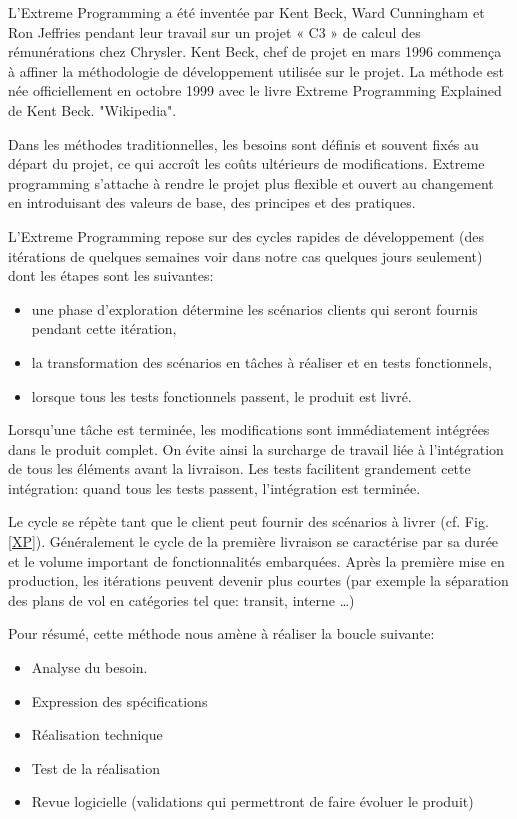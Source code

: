 L'Extreme Programming a été inventée par Kent Beck, Ward Cunningham et Ron Jeffries pendant leur travail sur un projet « C3 » de calcul des rémunérations chez Chrysler. Kent Beck, chef de projet en mars 1996 commença à affiner la méthodologie de développement utilisée sur le projet. La méthode est née officiellement en octobre 1999 avec le livre Extreme Programming Explained de Kent Beck. "Wikipedia".

Dans les méthodes traditionnelles, les besoins sont définis et souvent fixés au départ du projet, ce qui accroît les coûts ultérieurs de modifications. Extreme programming s'attache à rendre le projet plus flexible et ouvert au changement en introduisant des valeurs de base, des principes et des pratiques.

L'Extreme Programming repose sur des cycles rapides de développement (des itérations de quelques semaines voir dans notre cas quelques jours seulement) dont les étapes sont les suivantes:
\begin{itemize}
\item une phase d'exploration détermine les scénarios clients qui seront fournis pendant cette itération,
\item la transformation des scénarios en tâches à réaliser et en tests fonctionnels,
\item lorsque tous les tests fonctionnels passent, le produit est livré.
\end{itemize}\medskip

Lorsqu'une tâche est terminée, les modifications sont immédiatement intégrées dans le produit complet. On évite ainsi la surcharge de travail liée à l'intégration de tous les éléments avant la livraison. Les tests facilitent grandement cette intégration: quand tous les tests passent, l'intégration est terminée.

Le cycle se répète tant que le client peut fournir des scénarios à livrer (cf. Fig. \vref{XP}). Généralement le cycle de la première livraison se caractérise par sa durée et le volume important de fonctionnalités embarquées. Après la première mise en production, les itérations peuvent devenir plus courtes (par exemple la séparation des plans de vol en catégories tel que: transit, interne …)

Pour résumé, cette méthode nous amène à réaliser la boucle suivante:
\begin{itemize}
\item Analyse du besoin.
\item Expression des spécifications
\item Réalisation technique
\item Test de la réalisation
\item Revue logicielle (validations qui permettront de faire évoluer le produit)
\end{itemize}\medskip

